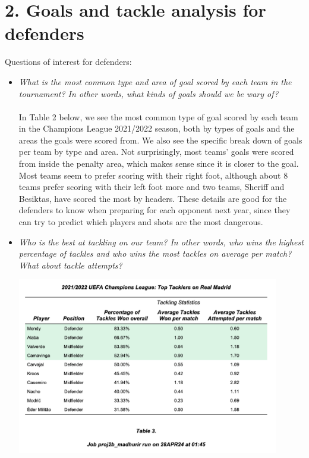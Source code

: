\documentclass[11pt]{report}
\begin{document}
	
	

\section*{2. Goals and tackle analysis for defenders} 
Questions of interest for defenders:
	\begin{itemize}
		\item \textit{What is the most common type and area of goal scored by each team in the tournament? In other words, what kinds of goals should we be wary of?} \\ \\
			In Table 2 below, we see the most common type of goal scored by each team in the Champions League 2021/2022 season, both by types of goals and the areas the goals were scored from. We also see the specific break down of goals per team by type and area. Not surprisingly, most teams' goals were scored from inside the penalty area, which makes sense since it is closer to the goal. Most teams seem to prefer scoring with their right foot, although about 8 teams prefer scoring with their left foot more and two teams, Sheriff and Besiktas, have scored the most by headers. These details are good for the defenders to know when preparing for each opponent next year, since they can try to predict which players and shots are the most dangerous. 
			
			\item \textit{Who is the best at tackling on our team? In other words, who wins the highest percentage of tackles and who wins the most tackles on average per match? What about tackle attempts?}
			\begin{center}
				\includegraphics[width=0.9\textwidth]{images_for_report/table3}
			\end{center} 

\end{itemize}
\end{document}
